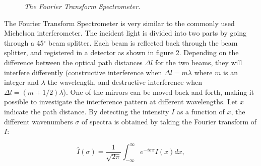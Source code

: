 \documentclass[a4paper]{article}
\begin{document}
\begin{figure}[htb!]

\label{FTS}

\begin{center}


\end{center}

\caption{\textit{The Fourier Transform Spectrometer.}}

\end{figure}

The Fourier Transform Spectrometer is very similar to the commonly used Michelson interferometer. The incident light is divided into two parts by going through a 45$^\circ$ beam splitter. Each beam is reflected back through the beam splitter, and registered in a detector as shown in figure 2. Depending on the difference between the optical path distances $\Delta l$ for the two beams, they will interfere differently (constructive interference when $\Delta l = m \lambda$ where $m$ is an integer and $\lambda$ the wavelength, and destructive interference when $\Delta l = (m+ 1/2) \lambda$). One of the mirrors can be moved back and forth, making it possible to investigate the interference pattern at different wavelengths. Let $x$ indicate the path distance. By detecting the intensity $I$ as a function of $x$, the different wavenumbers $\sigma$ of spectra is obtained by taking the Fourier transform of $I$:

\begin{equation}

\hat{I}(\sigma ) = \frac{1}{\sqrt{2\pi }} \int_{-\infty}^{\infty} e^{-i\sigma x} I(x) dx,

\end{equation}
\end{document}
